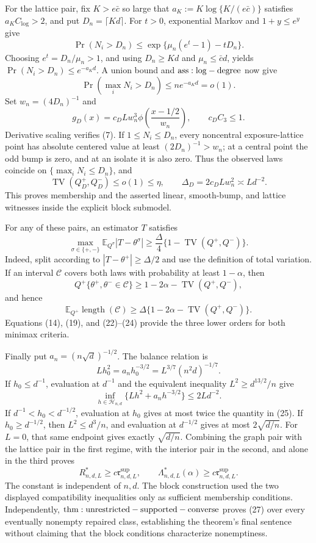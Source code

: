 For the lattice pair, fix \(K>e\bar c\) so large that \(a_K:=K\log\{K/(e\bar c)\}\) satisfies \(a_KC_{\log}>2\), and put \(D_n=\lceil Kd\rceil\).  For \(t>0\), exponential Markov and \(1+y\leq e^y\) give
\[
 \Pr(N_i>D_n)\leq
 \exp\{\mu_n(e^t-1)-tD_n\}.
\]
Choosing \(e^t=D_n/\mu_n>1\), and using \(D_n\geq Kd\) and \(\mu_n\leq\bar c d\), yields \(\Pr(N_i>D_n)\leq e^{-a_Kd}\).  A union bound and \({\rm ass:log-degree}\) now give
\[
 \Pr(\max_iN_i>D_n)\leq ne^{-a_Kd}=o(1).
\tag{20}
\]
Set \(w_n=(4D_n)^{-1}\) and
\[
 g_D(x)=c_DLw_n^3\phi\!\left(\frac{x-1/2}{w_n}\right),
 \qquad c_DC_3\leq1.
\tag{21}
\]
Derivative scaling verifies (7).  If \(1\leq N_i\leq D_n\), every noncentral exposure-lattice point has absolute centered value at least \((2D_n)^{-1}>w_n\); at a central point the odd bump is zero, and at an isolate it is also zero.  Thus the observed laws coincide on \(\{\max_iN_i\leq D_n\}\), and
\[
 \operatorname{TV}(Q_D^+,Q_D^-)\leq o(1)\leq\eta,
 \qquad \Delta_D=2c_DLw_n^2\asymp Ld^{-2}.
\tag{22}
\]
This proves membership and the asserted linear, smooth-bump, and lattice witnesses inside the explicit block submodel.

For any of these pairs, an estimator \(T\) satisfies
\[
 \max_{\sigma\in\{+,-\}}\mathbb E_{Q^\sigma}|T-\theta^\sigma|
 \geq\frac\Delta4\{1-\operatorname{TV}(Q^+,Q^-)\}.
\tag{23}
\]
Indeed, split according to \(|T-\theta^+|\geq\Delta/2\) and use the definition of total variation.  If an interval \(\mathcal C\) covers both laws with probability at least \(1-\alpha\), then
\[
 Q^+\{\theta^+,\theta^-\in\mathcal C\}
 \geq1-2\alpha-\operatorname{TV}(Q^+,Q^-),
\]
and hence
\[
 \mathbb E_{Q^+}\operatorname{length}(\mathcal C)
 \geq\Delta\{1-2\alpha-\operatorname{TV}(Q^+,Q^-)\}.
\tag{24}
\]
Equations (14), (19), and (22)--(24) provide the three lower orders for both minimax criteria.

Finally put \(a_n=(n\sqrt d)^{-1/2}\).  The balance relation is
\[
 Lh_0^2=a_nh_0^{-3/2}=L^{3/7}(n^2d)^{-1/7}.
\tag{25}
\]
If \(h_0\leq d^{-1}\), evaluation at \(d^{-1}\) and the equivalent inequality \(L^2\geq d^{13/2}/n\) give
\[
 \inf_{h\in\mathcal H_{n,d}}\{Lh^2+a_nh^{-3/2}\}\leq2Ld^{-2}.
\tag{26}
\]
If \(d^{-1}<h_0<d^{-1/2}\), evaluation at \(h_0\) gives at most twice the quantity in (25).  If \(h_0\geq d^{-1/2}\), then \(L^2\leq d^3/n\), and evaluation at \(d^{-1/2}\) gives at most \(2\sqrt{d/n}\).  For \(L=0\), that same endpoint gives exactly \(\sqrt{d/n}\).  Combining the graph pair with the lattice pair in the first regime, with the interior pair in the second, and alone in the third proves
\[
 R^*_{n,d,L}\geq c\mathfrak r^{\mathrm{sup}}_{n,d,L},
 \qquad \Lambda^*_{n,d,L}(\alpha)\geq c\mathfrak r^{\mathrm{sup}}_{n,d,L}.
\tag{27}
\]
The constant is independent of \(n,d\).  The block construction used the two displayed compatibility inequalities only as sufficient membership conditions.  Independently, \({\rm thm:unrestricted-supported-converse}\) proves (27) over every eventually nonempty repaired class, establishing the theorem's final sentence without claiming that the block conditions characterize nonemptiness.